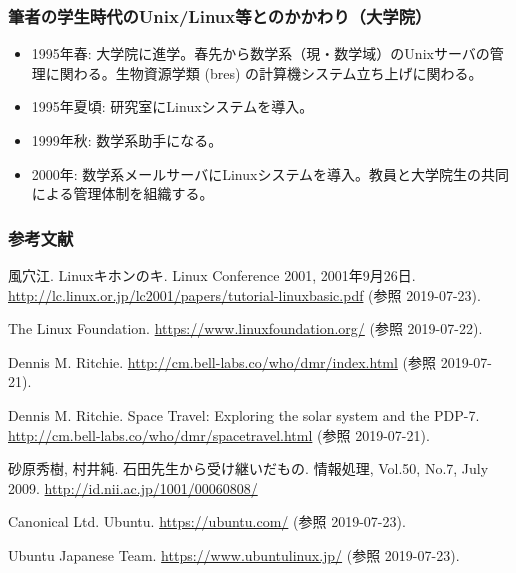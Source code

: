 \documentclass[dvipdfmx]{beamer}
\begin{document}
\begin{frame}%
    \frametitle{筆者の学生時代のUnix/Linux等とのかかわり（大学院）}
    \begin{itemize}
        \item<1-> 1995年春: 大学院に進学。春先から数学系（現・数学域）のUnixサーバの管理に関わる。生物資源学類 (bres) の計算機システム立ち上げに関わる。
        \item<2-> 1995年夏頃: 研究室にLinuxシステムを導入。
        \item<3-> 1999年秋: 数学系助手になる。
        \item<4-> 2000年: 数学系メールサーバにLinuxシステムを導入。教員と大学院生の共同による管理体制を組織する。
    \end{itemize}
\end{frame}

\begin{frame}[allowframebreaks]
    \frametitle{参考文献}
    \begin{thebibliography}{99}
         風穴江. Linuxキホンのキ. Linux Conference 2001, 2001年9月26日. 
        \url{http://lc.linux.or.jp/lc2001/papers/tutorial-linuxbasic.pdf} (参照 2019-07-23).

         The Linux Foundation. \url{https://www.linuxfoundation.org/} (参照 2019-07-22).

         Dennis M. Ritchie. \url{http://cm.bell-labs.co/who/dmr/index.html} (参照 2019-07-21).

         Dennis M. Ritchie. Space Travel: Exploring the solar system and the PDP-7. \url{http://cm.bell-labs.co/who/dmr/spacetravel.html} (参照 2019-07-21).
        
         砂原秀樹, 村井純. 石田先生から受け継いだもの. 情報処理, Vol.50, No.7, July 2009. \url{http://id.nii.ac.jp/1001/00060808/}

         Canonical Ltd. Ubuntu. \url{https://ubuntu.com/} (参照 2019-07-23).

         Ubuntu Japanese Team. \url{https://www.ubuntulinux.jp/} (参照 2019-07-23).
        
    \end{thebibliography}    
\end{frame}
\end{document}
